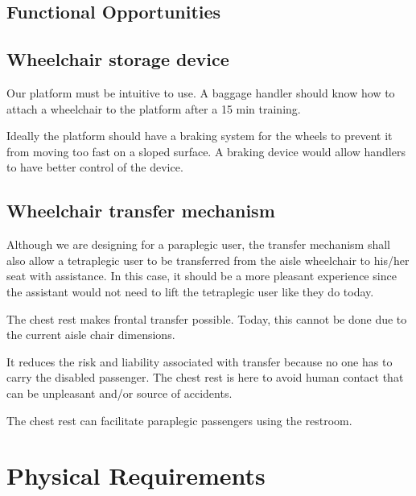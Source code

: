 \subsection{Functional Opportunities}

\subsection*{Wheelchair storage device}

\begin{list}{-}{}
  \item Our platform must be intuitive to use. A baggage handler should know how to attach a wheelchair to the platform after a 15 min training.
  \item Ideally the platform should have a braking system for the wheels to prevent it from moving too fast on a sloped surface. A braking device would allow handlers to have better control of the device.
\end{list}

\subsection*{Wheelchair transfer mechanism}

\begin{list}{-}{}
  \item Although we are designing for a paraplegic user, the transfer mechanism shall also allow a tetraplegic user to be transferred from the aisle wheelchair to his/her seat with assistance. In this case, it should be a more pleasant experience since the assistant would not need to lift the tetraplegic user like they do today.
  \item The chest rest makes frontal transfer possible. Today, this cannot be done due to the current aisle chair dimensions.
  \item It reduces the risk and liability associated with transfer because no one has to carry the disabled passenger. The chest rest is here to avoid human contact that can be unpleasant and/or source of accidents.
  \item The chest rest can facilitate paraplegic passengers using the restroom.
\end{list}


\section{Physical Requirements}


